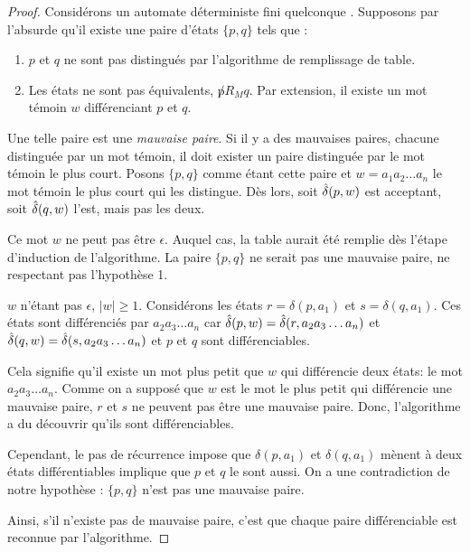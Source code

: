 	 \begin{proof}
	 	
	 Considérons un automate déterministe fini quelconque \automaton. Supposons par l'absurde qu'il existe une paire d'états $\{p,q\}$ tels que :
	 \begin{enumerate}
	 		\item $p$ et $q$ ne sont pas distingués par l'algorithme de remplissage de table.
	 		\item Les états ne sont pas équivalents, $\not pR_M q$. Par extension, il existe un mot témoin $w$ différenciant $p$ et $q$.
	 \end{enumerate}
	 	
	 Une telle paire est une \emph{mauvaise paire}. Si il y a des mauvaises paires, chacune distinguée par un mot témoin, il doit exister un paire distinguée par le mot témoin le plus court. Posons $\{p,q\}$ comme étant cette paire et $w=a_1a_2\dots a_n$ le mot témoin le plus court qui les distingue. Dès lors, soit $\hat{\delta}(p,w)$ est acceptant, soit $\hat{\delta}(q,w)$ l'est, mais pas les deux.
	 	
	 Ce mot $w$ ne peut pas être $\epsilon$. Auquel cas, la table aurait été remplie dès l'étape d'induction de l'algorithme. La paire $\{p,q\}$ ne serait pas une mauvaise paire, ne respectant pas l'hypothèse 1.
	 
	 $w$ n'étant pas $\epsilon$, $ |w| \ge 1$. Considérons les états $r = \delta(p,a_1)$ et $s=\delta(q,a_1)$. Ces états sont différenciés par $a_2a_3\dots a_n$ car $\hat{\delta}(p,w) = \hat{\delta}(r, a_2a_3\dots a_n)$ et $\hat{\delta}(q,w) = \hat{\delta}(s, a_2a_3\dots a_n)$ et $p$ et $q$ sont différenciables.
	 
	 Cela signifie qu'il existe un mot plus petit que $w$ qui différencie deux états: le mot $a_2a_3\dots a_n$. Comme on a supposé que $w$ est le mot le plus petit qui différencie une mauvaise paire, $r$ et $s$ ne peuvent pas être une mauvaise paire. Donc, l'algorithme a du découvrir qu'ils sont différenciables.
	 	
	 Cependant, le pas de récurrence impose que $\delta(p, a_1)$ et $\delta(q, a_1)$ mènent à deux états différentiables implique que $p$ et $q$ le sont aussi. On a une contradiction de notre hypothèse : $\{p,q\}$ n'est pas une mauvaise paire.
	 
	 Ainsi, s'il n'existe pas de mauvaise paire, c'est que chaque paire différenciable est reconnue par l'algorithme.
	 \end{proof}
	 
